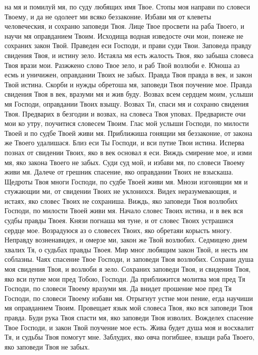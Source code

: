  на мя и помилуй мя, по суду любящих имя Твое. Стопы моя направи по словеси Твоему, и да не одолеет ми всяко беззаконие. Избави мя от клеветы человеческия, и сохраню заповеди Твоя. Лице Твое просвети на раба Твоего, и научи мя оправданием Твоим. Исходища водная изведосте очи мои, понеже не сохраних закон Твой. Праведен еси Господи, и прави суди Твои. Заповеда правду свидения Твоя, и истину зело. Истаяла мя есть жалость Твоя, яко забыша словеса Твоя врази мои. Разжжено слово Твое зело, и раб Твой возлюби е. Юноша аз есмь и уничижен, оправдании Твоих не забых. Правда Твоя правда в век, и закон Твой истина. Скорби и нужды обретоша мя, заповеди Твоя поучение мое. Правда свидения Твоя в век, вразуми мя и жив буду. Возвах всем сердцем моим, услыши мя Господи, оправдании Твоих взыщу. Возвах Ти, спаси мя и сохраню свидения Твоя. Предварих в безгодии и возвах, на словеса Твоя уповах. Предваристе очи мои ко утру, поучитися словесем Твоим. Глас мой услыши Господи, по милости Твоей и по судбе Твоей живи мя. Приближиша гонящии мя беззаконие, от закона же Твоего удалишася. Близ еси Ты Господи, и вси путие Твои истина. Исперва познах от свидении Твоих, яко в век основал я еси. Виждь смирение мое, и изми мя, яко закона Твоего не забых. Суди суд мой, и избави мя, по словеси Твоему живи мя. Далече от грешник спасение, яко оправдании Твоих не взыскаша. Щедроты Твоя многи Господи, по судбе Твоей живи мя. Мнози изгонящии мя и стужающии ми, от свидении Твоих не уклонихся. Видех неразумевающия, и истаях, яко словес Твоих не сохраниша. Виждь, яко заповеди Твоя возлюбих Господи, по милости Твоей живи мя. Начало словес Твоих истина, и в век вся судбы правды Твоея. Князи погнаша мя туне, и от словес Твоих устрашися сердце мое. Возрадуюся аз о словесех Твоих, яко обретаяи корысть многу. Неправду возненавидех, и омерзе ми, закон же Твой возлюбих. Седмицею днем хвалих Тя, о судьбах правды Твоея. Мир мног любящим закон Твой, и несть им соблазны. Чаях спасение Твое Господи, и заповеди Твоя возлюбих. Сохрани душа моя свидения Твоя, и возлюби я зело. Сохраних заповеди Твоя, и свидения Твоя, яко вси путие мои пред Тобою, Господи. Да приближится молитва моя пред Тя Господи, по словеси Твоему вразуми мя. Да внидет прошение мое пред Тя Господи, по словеси Твоему избави мя. Отрыгнут устне мои пение, егда научиши мя оправданием Твоим. Провещает язык мой словеса Твоя, яко вся заповеди Твоя правда. Буди рука Твоя спасти мя, яко заповеди Твоя изволих. Вожделех спасение Твое Господи, и закон Твой поучение мое есть. Жива будет душа моя и восхвалит Тя, и судьбы Твоя помогут мне. Заблудих, яко овча погибшее, взыщи раба Твоего, яко заповеди Твоя не забых. 


